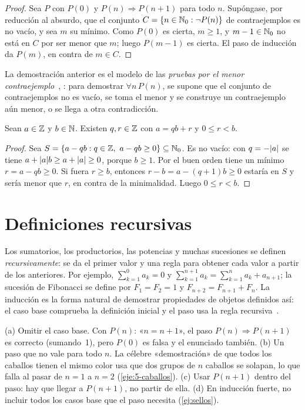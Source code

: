 \begin{proof}
Sea $P$ con $P(0)$ y $P(n)\Rightarrow P(n+1)$ para todo $n$. Supóngase, por reducción al absurdo, que el conjunto $C=\{n\in\mathbb{N}_0:\neg P(n)\}$ de contraejemplos es no vacío, y sea $m$ su mínimo. Como $P(0)$ es cierta, $m\ge 1$, y $m-1\in\mathbb{N}_0$ no está en $C$ por ser menor que $m$; luego $P(m-1)$ es cierta. El paso de inducción da $P(m)$, en contra de $m\in C$.
\end{proof}

La demostración anterior es el modelo de las \emph{pruebas por el menor contraejemplo}~\cite[§2.2]{mcs}, \cite[§10.3]{hammack}: para demostrar $\forall n\,P(n)$, se supone que el conjunto de contraejemplos no es vacío, se toma el menor y se construye un contraejemplo aún menor, o se llega a otra contradicción.

\begin{proposicion}\label{prop:division-existencia}
Sean $a\in\mathbb{Z}$ y $b\in\mathbb{N}$. Existen $q,r\in\mathbb{Z}$ con $a=qb+r$ y $0\le r<b$.
\end{proposicion}

\begin{proof}
Sea $S=\{a-qb: q\in\Z,\ a-qb\ge 0\}\subseteq\N_0$. Es no vacío: con $q=-\lvert a\rvert$ se tiene $a+\lvert a\rvert b\ge a+\lvert a\rvert\ge 0$, porque $b\ge 1$. Por el buen orden tiene un mínimo $r=a-qb\ge 0$. Si fuera $r\ge b$, entonces $r-b=a-(q+1)b\ge 0$ estaría en $S$ y sería menor que $r$, en contra de la minimalidad. Luego $0\le r<b$.
\end{proof}

\section{Definiciones recursivas}

Los sumatorios, los productorios, las potencias y muchas sucesiones se definen \emph{recursivamente}: se da el primer valor y una regla para obtener cada valor a partir de los anteriores. Por ejemplo, $\sum_{k=1}^{0}a_k=0$ y $\sum_{k=1}^{n+1}a_k=\sum_{k=1}^{n}a_k+a_{n+1}$; la sucesión de Fibonacci se define por $F_1=F_2=1$ y $F_{n+2}=F_{n+1}+F_n$. La inducción es la forma natural de demostrar propiedades de objetos definidos así: el caso base comprueba la definición inicial y el paso usa la regla recursiva~\cite[§10.5]{hammack}.

\begin{observacion}\label{obs:5-errores}
(a) Omitir el caso base. Con $P(n)$: «$n=n+1$», el paso $P(n)\Rightarrow P(n+1)$ es correcto (sumando~1), pero $P(0)$ es falsa y el enunciado también.
(b) Un paso que no vale para todo $n$. La célebre «demostración» de que todos los caballos tienen el mismo color usa que dos grupos de $n$ caballos se solapan, lo que falla al pasar de $n=1$ a $n=2$ (\cref{eje:5-caballos}).
(c) Usar $P(n+1)$ dentro del paso: hay que llegar a $P(n+1)$, no partir de ella.
(d) En inducción fuerte, no incluir todos los casos base que el paso necesita (\cref{ej:sellos}).
\end{observacion}

